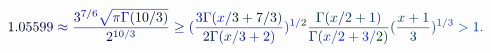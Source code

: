 \documentclass[12pt]{article}
\begin{document}
\makeatletter
\renewcommand*{\@textcolor}[3]{%
  \protect\leavevmode
  \begingroup
    \color#1{#2}#3%
  \endgroup
}
\makeatother
\begin{displaymath}
\mathcolor[RGB]{0,0,15}{1} \mathcolor[RGB]{0,0,30}{.} \mathcolor[RGB]{0,0,45}{0} \mathcolor[RGB]{0,0,60}{5} \mathcolor[RGB]{0,0,75}{5} \mathcolor[RGB]{0,0,90}{9} \mathcolor[RGB]{0,0,105}{9} \mathcolor[RGB]{0,0,120}{\approx} \mathcolor[RGB]{0,0,135}{\frac { \mathcolor[RGB]{0,0,150}{3} ^ { \mathcolor[RGB]{0,0,165}{7} \mathcolor[RGB]{0,0,180}{/} \mathcolor[RGB]{0,0,195}{6} } \mathcolor[RGB]{0,0,210}{\sqrt { \mathcolor[RGB]{0,0,225}{\pi} \mathcolor[RGB]{0,0,240}{\Gamma} \mathcolor[RGB]{0,0,255}{(} \mathcolor[RGB]{0,15,0}{1} \mathcolor[RGB]{0,15,15}{0} \mathcolor[RGB]{0,15,30}{/} \mathcolor[RGB]{0,15,45}{3} \mathcolor[RGB]{0,15,60}{)} } } } { \mathcolor[RGB]{0,15,75}{2} ^ { \mathcolor[RGB]{0,15,90}{1} \mathcolor[RGB]{0,15,105}{0} \mathcolor[RGB]{0,15,120}{/} \mathcolor[RGB]{0,15,135}{3} } } } \mathcolor[RGB]{0,15,150}{\ge} \mathcolor[RGB]{0,15,165}{(} \mathcolor[RGB]{0,15,180}{\frac { \mathcolor[RGB]{0,15,195}{3} \mathcolor[RGB]{0,15,210}{\Gamma} \mathcolor[RGB]{0,15,225}{(} \mathcolor[RGB]{0,15,240}{x} \mathcolor[RGB]{0,15,255}{/} \mathcolor[RGB]{0,30,0}{3} \mathcolor[RGB]{0,30,15}{+} \mathcolor[RGB]{0,30,30}{7} \mathcolor[RGB]{0,30,45}{/} \mathcolor[RGB]{0,30,60}{3} \mathcolor[RGB]{0,30,75}{)} } { \mathcolor[RGB]{0,30,90}{2} \mathcolor[RGB]{0,30,105}{\Gamma} \mathcolor[RGB]{0,30,120}{(} \mathcolor[RGB]{0,30,135}{x} \mathcolor[RGB]{0,30,150}{/} \mathcolor[RGB]{0,30,165}{3} \mathcolor[RGB]{0,30,180}{+} \mathcolor[RGB]{0,30,195}{2} \mathcolor[RGB]{0,30,210}{)} } } \mathcolor[RGB]{0,30,225}{)} ^ { \mathcolor[RGB]{0,30,240}{1} \mathcolor[RGB]{0,30,255}{/} \mathcolor[RGB]{0,45,0}{2} } \mathcolor[RGB]{0,45,15}{\frac { \mathcolor[RGB]{0,45,30}{\Gamma} \mathcolor[RGB]{0,45,45}{(} \mathcolor[RGB]{0,45,60}{x} \mathcolor[RGB]{0,45,75}{/} \mathcolor[RGB]{0,45,90}{2} \mathcolor[RGB]{0,45,105}{+} \mathcolor[RGB]{0,45,120}{1} \mathcolor[RGB]{0,45,135}{)} } { \mathcolor[RGB]{0,45,150}{\Gamma} \mathcolor[RGB]{0,45,165}{(} \mathcolor[RGB]{0,45,180}{x} \mathcolor[RGB]{0,45,195}{/} \mathcolor[RGB]{0,45,210}{2} \mathcolor[RGB]{0,45,225}{+} \mathcolor[RGB]{0,45,240}{3} \mathcolor[RGB]{0,45,255}{/} \mathcolor[RGB]{0,60,0}{2} \mathcolor[RGB]{0,60,15}{)} } } \mathcolor[RGB]{0,60,30}{(} \mathcolor[RGB]{0,60,45}{\frac { \mathcolor[RGB]{0,60,60}{x} \mathcolor[RGB]{0,60,75}{+} \mathcolor[RGB]{0,60,90}{1} } { \mathcolor[RGB]{0,60,105}{3} } } \mathcolor[RGB]{0,60,120}{)} ^ { \mathcolor[RGB]{0,60,135}{1} \mathcolor[RGB]{0,60,150}{/} \mathcolor[RGB]{0,60,165}{3} } \mathcolor[RGB]{0,60,180}{>} \mathcolor[RGB]{0,60,195}{1} \mathcolor[RGB]{0,60,210}{.}
\end{displaymath}
\end{document}
